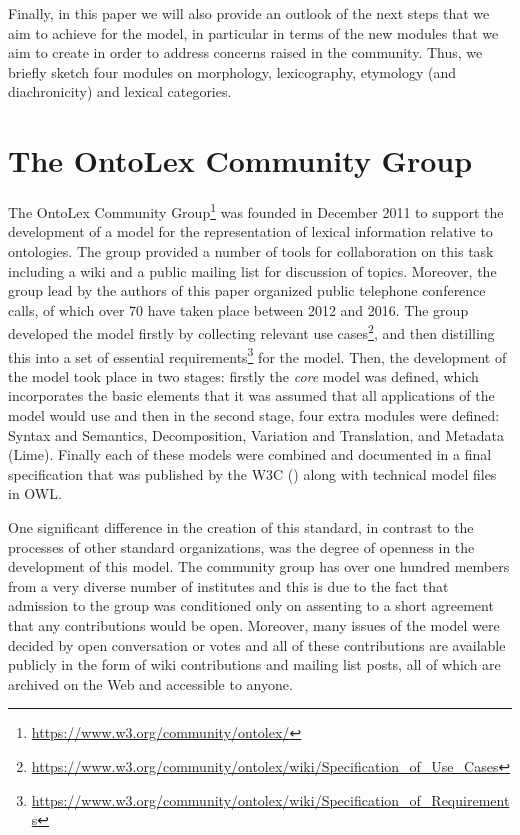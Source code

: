 \documentclass[12pt,a4paper]{elex2017}
\begin{document}
Finally, in this paper we will also provide an outlook of the next steps that we
aim to achieve for the model, in particular in terms of the new modules that we
aim to create in order to address concerns raised in the community.
Thus, we briefly sketch four modules on morphology, lexicography,
etymology (and diachronicity) and lexical categories.

\section{The OntoLex Community Group}

The OntoLex Community
Group\footnote{\url{https://www.w3.org/community/ontolex/}}  was founded in
December 2011 to support the development of a model for the representation of
lexical information relative to ontologies. The group provided a number of tools
for collaboration on this task including a wiki and a public mailing list for
discussion of topics. Moreover, the group lead by the authors of this paper
organized public telephone conference calls, of which over 70 have taken place
between 2012 and 2016. The group developed the model firstly by
collecting relevant use
cases\footnote{\url{https://www.w3.org/community/ontolex/wiki/Specification_of_Use_Cases}},
and then distilling this into a set of essential
requirements\footnote{\url{https://www.w3.org/community/ontolex/wiki/Specification_of_Requirements}}
for the model. Then, the development of the model took place in two stages:
firstly the \emph{core} model was defined, which incorporates the basic elements
that it was assumed that all applications of the model would use and then in the
second stage, four extra modules were defined: Syntax and Semantics,
Decomposition, Variation and Translation, and Metadata (Lime).
Finally each of these models were combined and documented in a final
specification that was published by the W3C (\cite{cimiano2016lexicon}) along with
technical model files in OWL.

One significant difference in the creation of this standard, in contrast to the
processes of other standard organizations, was the degree of openness in the
development of this model. The community group has over one hundred members from a
very diverse number of institutes and this is due to the fact that admission to
the group was conditioned only on assenting to a short agreement that
any contributions would be open. Moreover, many issues of the model were
decided by open conversation or votes and all of these contributions are available publicly in the form of wiki
contributions and mailing list posts, all of which are archived on the Web and
accessible to anyone. 
\end{document}

